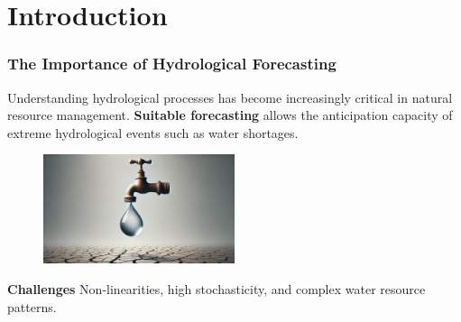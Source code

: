 \section{Introduction}

\begin{frame}
	\frametitle{The Importance of Hydrological Forecasting}
	\begin{block}{}
		Understanding hydrological processes has become increasingly critical in natural resource management.  \textcolor{BrandTeal}{\textbf{Suitable forecasting}} allows the anticipation capacity of extreme hydrological events such as water shortages.
	\end{block}
	\begin{figure}
		\centering
			\includegraphics[width=0.5\textwidth]{figures/shortage}
	\end{figure}
	\begin{block}{\textcolor{myNewColorB}{\textbf{Challenges}}}
		Non-linearities, high stochasticity, and complex water resource patterns.
	\end{block}
	
\end{frame}